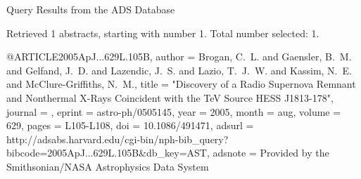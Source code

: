 Query Results from the ADS Database


Retrieved 1 abstracts, starting with number 1.  Total number selected: 1.

@ARTICLE{2005ApJ...629L.105B,
   author = {{Brogan}, C.~L. and {Gaensler}, B.~M. and {Gelfand}, J.~D. and 
	{Lazendic}, J.~S. and {Lazio}, T.~J.~W. and {Kassim}, N.~E. and 
	{McClure-Griffiths}, N.~M.},
    title = "{Discovery of a Radio Supernova Remnant and Nonthermal X-Rays Coincident with the TeV Source HESS J1813-178}",
  journal = {\apjl},
   eprint = {astro-ph/0505145},
     year = 2005,
    month = aug,
   volume = 629,
    pages = {L105-L108},
      doi = {10.1086/491471},
   adsurl = {http://adsabs.harvard.edu/cgi-bin/nph-bib_query?bibcode=2005ApJ...629L.105B&db_key=AST},
  adsnote = {Provided by the Smithsonian/NASA Astrophysics Data System}
}


